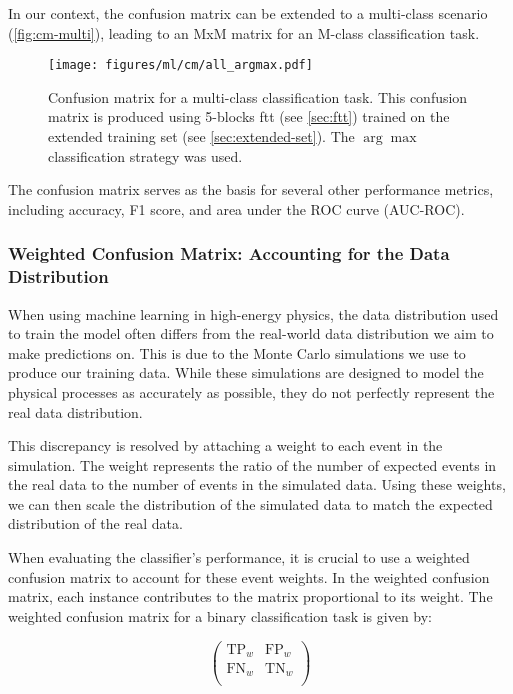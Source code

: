 In our context, the confusion matrix can be extended to a multi-class scenario (\autoref{fig:cm-multi}), leading to an
MxM matrix for an M-class classification task. 

\begin{figure}[htb]
    \centering
    \texttt{[image: figures/ml/cm/all\_argmax.pdf]}
    \caption{Confusion matrix for a multi-class classification task. This confusion matrix is produced using 5-blocks
        \gls{ftt} (see \autoref{sec:ftt}) trained on the extended training set (see \autoref{sec:extended-set}). The
        $\arg\max$ classification strategy was used.}
    \label{fig:cm-muli}
\end{figure}

The confusion matrix serves as the basis for several other performance metrics, including accuracy, F1 score, and area
under the ROC curve (AUC-ROC).

\subsubsection{Weighted Confusion Matrix: Accounting for the Data Distribution}

When using machine learning in high-energy physics, the data distribution used to train the model often differs from the
real-world data distribution we aim to make predictions on. This is due to the Monte Carlo simulations we use to produce
our training data. While these simulations are designed to model the physical processes as accurately as possible, they
do not perfectly represent the real data distribution.

This discrepancy is resolved by attaching a weight to each event in the simulation. The weight represents the ratio of
the number of expected events in the real data to the number of events in the simulated data. Using these weights, we
can then scale the distribution of the simulated data to match the expected distribution of the real data.

When evaluating the classifier's performance, it is crucial to use a weighted confusion matrix to account for these
event weights. In the weighted confusion matrix, each instance contributes to the matrix proportional to its weight. The
weighted confusion matrix for a binary classification task is given by:

\begin{equation}
    \begin{pmatrix}
        \text{TP}_{w} & \text{FP}_{w} \\
        \text{FN}_{w} & \text{TN}_{w} \\
    \end{pmatrix}
\end{equation}

